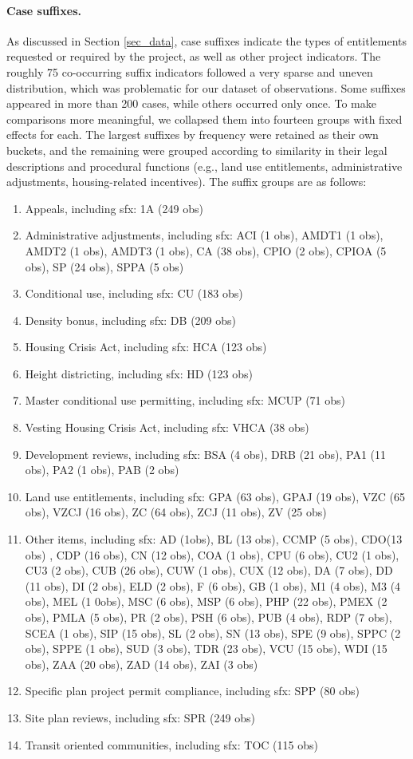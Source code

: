 \paragraph{Case suffixes.} As discussed in Section \ref{sec_data}, case suffixes indicate the types of entitlements requested or required by the project, as well as other project indicators. 
The roughly 75 co-occurring suffix indicators followed a very sparse and uneven distribution, which was problematic for our dataset of  observations. Some suffixes appeared in more than 200 cases, while others occurred only once. To make comparisons more meaningful, we collapsed them into fourteen groups with fixed effects for each. The largest suffixes by frequency were retained as their own buckets, and the remaining were grouped according to similarity in their legal descriptions and procedural functions (e.g., land use entitlements, administrative adjustments, housing-related incentives). The suffix groups are as follows:
\begin{enumerate}
\item Appeals, including sfx: 1A (249 obs)
\item Administrative adjustments, including sfx: ACI (1 obs), AMDT1 (1 obs), AMDT2 (1 obs), AMDT3 (1 obs), CA (38 obs), CPIO (2 obs), CPIOA (5 obs), SP (24 obs), SPPA (5 obs)
\item Conditional use, including sfx: CU (183 obs)
\item Density bonus, including sfx: DB (209 obs)
\item Housing Crisis Act, including sfx: HCA (123 obs)
\item Height districting, including sfx: HD (123 obs)
\item Master conditional use permitting, including sfx: MCUP (71 obs)
\item Vesting Housing Crisis Act, including sfx: VHCA (38 obs)
\item Development reviews, including sfx: BSA (4 obs), DRB (21 obs), PA1 (11 obs), PA2 (1 obs), PAB (2 obs)
\item Land use entitlements, including sfx: GPA (63 obs), GPAJ (19 obs), VZC (65 obs), VZCJ (16 obs), ZC (64 obs), ZCJ (11 obs), ZV (25 obs)
\item Other items, including sfx: AD (1obs), BL (13 obs), CCMP (5 obs), CDO(13 obs) , CDP (16 obs), CN (12 obs), COA (1 obs), CPU (6 obs), CU2 (1 obs), CU3 (2 obs), CUB (26 obs), CUW (1 obs), CUX (12 obs), DA (7 obs), DD (11 obs), DI (2 obs), ELD (2 obs), F (6 obs), GB (1 obs), M1 (4 obs), M3 (4 obs), MEL (1 0obs), MSC (6 obs), MSP (6 obs), PHP (22 obs), PMEX (2 obs), PMLA (5 obs), PR (2 obs), PSH (6 obs), PUB (4 obs), RDP (7 obs), SCEA (1 obs), SIP (15 obs), SL (2 obs), SN (13 obs), SPE (9 obs), SPPC (2 obs), SPPE (1 obs), SUD (3 obs), TDR (23 obs), VCU (15 obs), WDI (15 obs), ZAA (20 obs), ZAD (14 obs), ZAI (3 obs)
\item Specific plan project permit compliance, including sfx: SPP (80 obs)
\item Site plan reviews, including sfx: SPR (249 obs)
\item Transit oriented communities, including sfx: TOC (115 obs)
\end{enumerate}










